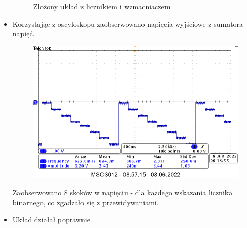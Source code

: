 \begin{itemize}
\begin{figure}[H]
            \caption{Złożony układ z licznikiem i wzmacniaczem}
        \end{figure}
    \item Korzystając z oscyloskopu zaobserwowano napięcia wyjściowe z sumatora napięć.
        \begin{figure}[H]
            \centering
            \includegraphics[width=\textwidth]{img/2/2_dziala2_cropped.png}
        \end{figure}
        Zaobserwowano 8 skoków w napięciu - dla każdego wskazania licznika binarnego, co zgadzało się z przewidywaniami.
    \item Układ działał poprawnie.
\end{itemize}